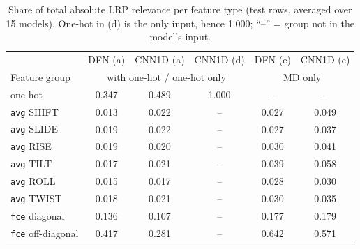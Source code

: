 \begin{table}[H]\centering\scriptsize\setlength{\tabcolsep}{3pt}
\caption{Share of total absolute LRP relevance per feature type (test rows, averaged over 15 models). One-hot in (d) is the only input, hence 1.000; ``--'' = group not in the model's input.}
\begin{tabular}{l|ccc|cc}\toprule
& DFN (a) & CNN1D (a) & CNN1D (d) & DFN (e) & CNN1D (e)\\
Feature group & \multicolumn{3}{c|}{with one-hot / one-hot only} & \multicolumn{2}{c}{MD only}\\\midrule
one-hot & 0.347 & 0.489 & 1.000 & -- & -- \\
\texttt{avg} SHIFT & 0.013 & 0.022 & -- & 0.027 & 0.049 \\
\texttt{avg} SLIDE & 0.019 & 0.022 & -- & 0.027 & 0.037 \\
\texttt{avg} RISE & 0.019 & 0.020 & -- & 0.030 & 0.041 \\
\texttt{avg} TILT & 0.017 & 0.021 & -- & 0.039 & 0.058 \\
\texttt{avg} ROLL & 0.015 & 0.017 & -- & 0.028 & 0.030 \\
\texttt{avg} TWIST & 0.018 & 0.021 & -- & 0.030 & 0.035 \\
\texttt{fce} diagonal & 0.136 & 0.107 & -- & 0.177 & 0.179 \\
\texttt{fce} off-diagonal & 0.417 & 0.281 & -- & 0.642 & 0.571 \\
\bottomrule\end{tabular}\label{tab:lrpgroups}\end{table}

